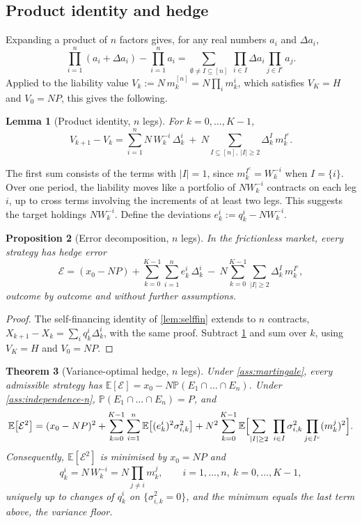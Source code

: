 \documentclass[11pt,a4paper]{article}
\theoremstyle{plain}
\newtheorem{theorem}{Theorem}[section]
\newtheorem{proposition}[theorem]{Proposition}
\newtheorem{lemma}[theorem]{Lemma}
\theoremstyle{definition}
\theoremstyle{remark}
\newcommand{\E}{\mathbb{E}}
\newcommand{\Prob}{\mathbb{P}}
\newcommand{\1}{\mathbf{1}}
\begin{document}
\subsection{Product identity and hedge}

Expanding a product of $n$ factors gives, for any real numbers $a_i$ and $\Delta a_i$,
\[
\prod_{i=1}^n(a_i+\Delta a_i) - \prod_{i=1}^n a_i = \sum_{\emptyset\neq I\subseteq[n]}\ \prod_{i\in I}\Delta a_i\prod_{j\in I^c}a_j.
\]
Applied to the liability value $V_k := N\,m^{[n]}_k = N\prod_i m^i_k$, which satisfies $V_K = H$ and $V_0 = NP$, this gives the following.

\begin{lemma}[Product identity, $n$ legs]
\label{lem:product-n}
For $k=0,\dots,K-1$,
\[
V_{k+1}-V_k = \sum_{i=1}^n N\,W^{-i}_k\,\Delta^i_k\ +\ N\sum_{I\subseteq[n],\ |I|\geq 2}\Delta^I_k\,m^{I^c}_k.
\]
\end{lemma}

The first sum consists of the terms with $|I|=1$, since $m^{I^c}_k = W^{-i}_k$ when $I=\{i\}$. Over one period, the liability moves like a portfolio of $NW^{-i}_k$ contracts on each leg $i$, up to cross terms involving the increments of at least two legs. This suggests the target holdings $NW^{-i}_k$. Define the deviations $e^i_k := q^i_k - NW^{-i}_k$.

\begin{proposition}[Error decomposition, $n$ legs]
\label{prop:decomposition-n}
In the frictionless market, every strategy has hedge error
\[
\mathcal{E} = (x_0 - NP) + \sum_{k=0}^{K-1}\sum_{i=1}^n e^i_k\,\Delta^i_k\ -\ N\sum_{k=0}^{K-1}\sum_{|I|\geq 2}\Delta^I_k\,m^{I^c}_k,
\]
outcome by outcome and without further assumptions.
\end{proposition}

\begin{proof}
The self-financing identity of \cref{lem:selffin} extends to $n$ contracts, $X_{k+1}-X_k = \sum_i q^i_k\Delta^i_k$, with the same proof. Subtract \cref{lem:product-n} and sum over $k$, using $V_K = H$ and $V_0 = NP$.
\end{proof}

\begin{theorem}[Variance-optimal hedge, $n$ legs]
\label{thm:hedge-n}
Under \cref{ass:martingale}, every admissible strategy has $\E[\mathcal{E}] = x_0 - N\Prob(E_1\cap\dots\cap E_n)$. Under \cref{ass:independence-n}, $\Prob(E_1\cap\dots\cap E_n) = P$, and
\[
\E\bigl[\mathcal{E}^2\bigr] = (x_0 - NP)^2 + \sum_{k=0}^{K-1}\sum_{i=1}^n\E\bigl[(e^i_k)^2\sigma^2_{i,k}\bigr] + N^2\sum_{k=0}^{K-1}\E\Bigl[\sum_{|I|\geq 2}\ \prod_{i\in I}\sigma^2_{i,k}\prod_{j\in I^c}(m^j_k)^2\Bigr].
\]
Consequently, $\E[\mathcal{E}^2]$ is minimised by $x_0 = NP$ and
\[
q^i_k = N\,W^{-i}_k = N\prod_{j\neq i}m^j_k,\qquad i=1,\dots,n,\ k=0,\dots,K-1,
\]
uniquely up to changes of $q^i_k$ on $\{\sigma^2_{i,k}=0\}$, and the minimum equals the last term above, the \emph{variance floor}.
\end{theorem}
\end{document}

